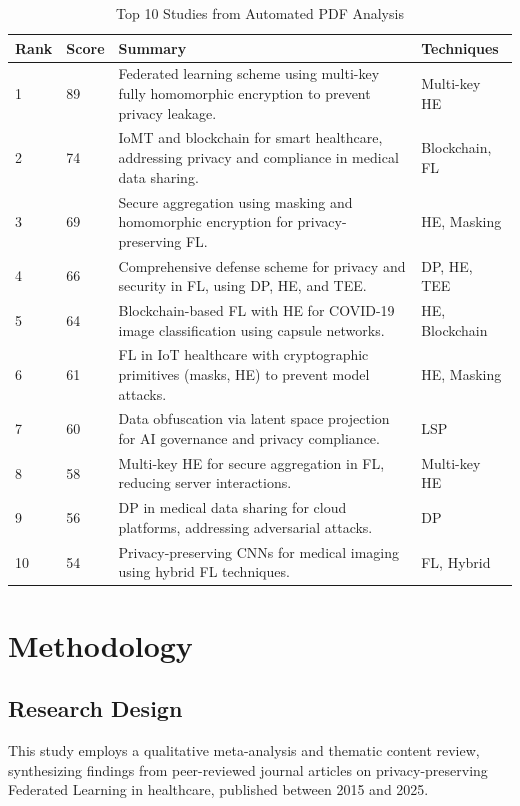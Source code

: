 \documentclass[12pt]{report}
\begin{document}
\begin{table}[h]
    \centering
    \begin{tabular}{|p{1.5cm}|p{2cm}|p{8cm}|p{2cm}|}
        \hline
        \textbf{Rank} & \textbf{Score} & \textbf{Summary} & \textbf{Techniques} \\
        \hline
        1 & 89 & Federated learning scheme using multi-key fully homomorphic encryption to prevent privacy leakage. & Multi-key HE \\
        2 & 74 & IoMT and blockchain for smart healthcare, addressing privacy and compliance in medical data sharing. & Blockchain, FL \\
        3 & 69 & Secure aggregation using masking and homomorphic encryption for privacy-preserving FL. & HE, Masking \\
        4 & 66 & Comprehensive defense scheme for privacy and security in FL, using DP, HE, and TEE. & DP, HE, TEE \\
        5 & 64 & Blockchain-based FL with HE for COVID-19 image classification using capsule networks. & HE, Blockchain \\
        6 & 61 & FL in IoT healthcare with cryptographic primitives (masks, HE) to prevent model attacks. & HE, Masking \\
        7 & 60 & Data obfuscation via latent space projection for AI governance and privacy compliance. & LSP \\
        8 & 58 & Multi-key HE for secure aggregation in FL, reducing server interactions. & Multi-key HE \\
        9 & 56 & DP in medical data sharing for cloud platforms, addressing adversarial attacks. & DP \\
        10 & 54 & Privacy-preserving CNNs for medical imaging using hybrid FL techniques. & FL, Hybrid \\
        \hline
    \end{tabular}
    \caption{Top 10 Studies from Automated PDF Analysis}
    \label{tab:script_results}
\end{table}

\chapter{Methodology}

\section{Research Design}
This study employs a qualitative meta-analysis and thematic content review, synthesizing findings from peer-reviewed journal articles on privacy-preserving Federated Learning in healthcare, published between 2015 and 2025.
\end{document}

